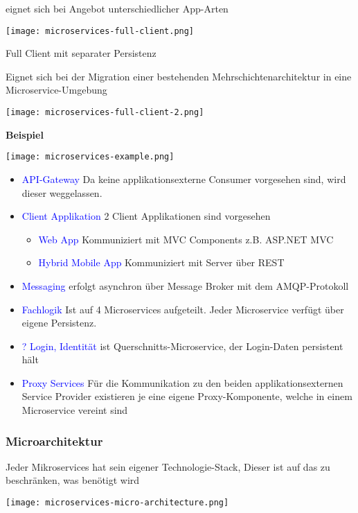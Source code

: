 eignet sich bei Angebot unterschiedlicher App-Arten

\texttt{[image: microservices-full-client.png]}

Full Client mit separater Persistenz

Eignet sich bei der Migration einer bestehenden Mehrschichtenarchitektur in eine Microservice-Umgebung

\texttt{[image: microservices-full-client-2.png]}

\textbf{Beispiel}

\texttt{[image: microservices-example.png]}

\begin{itemize}
    \item \textcolor{blue}{API-Gateway} Da keine applikationsexterne Consumer vorgesehen sind, wird dieser weggelassen.
    \item \textcolor{blue}{Client Applikation} 2 Client Applikationen sind vorgesehen
    \begin{itemize}
        \item \textcolor{blue}{Web App} Kommuniziert mit MVC Components z.B. ASP.NET MVC
        \item \textcolor{blue}{Hybrid Mobile App} Kommuniziert mit Server über REST
    \end{itemize}
    \item \textcolor{blue}{Messaging} erfolgt asynchron über Message Broker mit dem AMQP-Protokoll
    \item \textcolor{blue}{Fachlogik} Ist auf 4 Microservices aufgeteilt. Jeder Microservice verfügt über eigene Persistenz.
    \item \textcolor{blue}{? Login, Identität} ist Querschnitts-Microservice, der Login-Daten persistent hält
    \item \textcolor{blue}{Proxy Services} Für die Kommunikation zu den beiden applikationsexternen Service Provider existieren je eine eigene Proxy-Komponente, welche in einem Microservice vereint sind
\end{itemize}

\subsubsection{Microarchitektur}

Jeder Mikroservices hat sein eigener Technologie-Stack, Dieser ist auf das zu beschränken, was benötigt wird

\texttt{[image: microservices-micro-architecture.png]}

